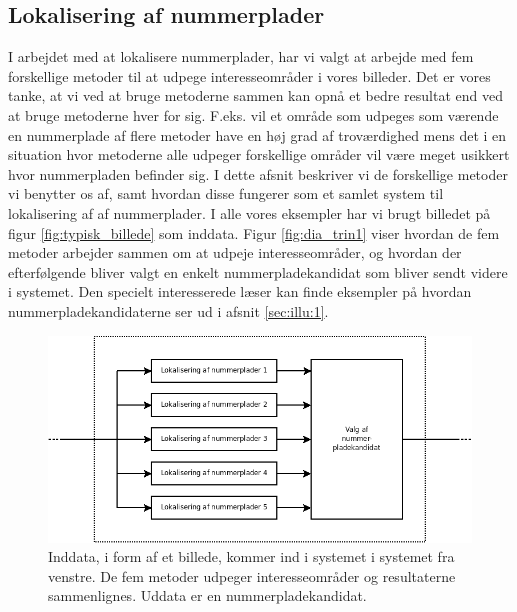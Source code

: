 \label{sec_billed}

\subsection{Lokalisering af nummerplader}
\label{sec:system:lokalisering}
I arbejdet med at lokalisere nummerplader, har vi valgt at arbejde med fem forskellige metoder til at udpege interesseområder i vores billeder. Det er vores tanke, at vi ved at bruge metoderne sammen kan opnå et bedre resultat end ved at bruge metoderne hver for sig. F.eks. vil et område som udpeges som værende en nummerplade af flere metoder have en høj grad af troværdighed mens det i en situation hvor metoderne alle udpeger forskellige områder vil være meget usikkert hvor nummerpladen befinder sig. I dette afsnit beskriver vi de forskellige metoder vi benytter os af, samt hvordan disse fungerer som et samlet system til lokalisering af af nummerplader. I alle vores eksempler har vi brugt billedet på figur \vref{fig:typisk_billede} som inddata. Figur \vref{fig:dia_trin1} viser hvordan de fem metoder  arbejder sammen om at udpeje interesseområder, og hvordan der efterfølgende bliver valgt en enkelt nummerpladekandidat som bliver sendt videre i systemet. Den specielt interesserede læser kan finde eksempler på hvordan nummerpladekandidaterne ser ud i afsnit \vref{sec:illu:1}.

\begin{figure}[htp]
\centering
\includegraphics[width=12cm]{system/illu/dia_trin1.png} 
\caption{Inddata, i form af et billede, kommer ind i systemet i systemet fra venstre. De fem metoder udpeger interesseområder og resultaterne sammenlignes. Uddata er en nummerpladekandidat.}
\label{fig:dia_trin1}
\end{figure}

